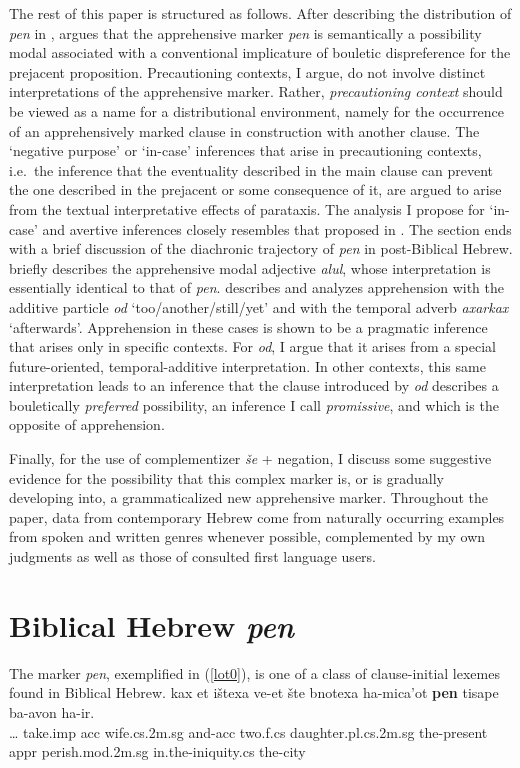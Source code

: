 \documentclass[output=paper,colorlinks,citecolor=brown]{langscibook}
\begin{document}
The rest of this paper is structured as follows. After describing the distribution of \textit{pen} in ,  argues that the apprehensive marker \textit{pen} is semantically a possibility modal associated with a conventional implicature of bouletic dispreference for the prejacent proposition. Precautioning contexts, I argue, do not involve distinct interpretations of the apprehensive marker. Rather, \textit{precautioning context} should be viewed as a name for a distributional environment, namely for the occurrence of an apprehensively marked clause in construction with another clause. The `negative purpose' or `in-case' inferences that arise in precautioning contexts, i.e.\ the inference that the eventuality described in the main clause can prevent the one described in the prejacent or some consequence of it, are argued to arise from the textual interpretative effects of parataxis. The analysis I propose for `in-case' and avertive inferences closely resembles that proposed in \citet{anderbois21}. The section ends with a brief discussion of the diachronic trajectory of \textit{pen} in post-Biblical Hebrew.  briefly describes the apprehensive modal adjective \textit{alul}, whose interpretation is essentially identical to that of \textit{pen}.  describes and analyzes apprehension with the additive particle \textit{od } `too/another/still/yet' and with the temporal adverb \textit{axarkax} `afterwards'. Apprehension in these cases is shown to be a pragmatic inference that arises only in specific contexts. For \textit{od}, I argue that it arises from a special future-oriented, temporal-additive interpretation. In other contexts, this same interpretation leads to an inference that the clause introduced by \textit{od} describes a bouletically \textit{preferred} possibility, an inference I call \textit{promissive}, and which is the opposite of apprehension.

Finally, for the use of complementizer \textit{še} + negation, I discuss some suggestive evidence for the possibility that this complex marker is, or is gradually developing into, a grammaticalized new apprehensive marker. Throughout the paper, data from contemporary Hebrew come from naturally occurring examples from spoken and written genres whenever possible, complemented by my own judgments as well as those of consulted first language users.

\section{Biblical Hebrew \textit{pen}}
\largerpage
\label{sec:biblicalhebrew}
The marker \textit{pen}, exemplified in (\ref{lot0}), is one of a class of clause-initial lexemes found in Biblical Hebrew. 
\ea
\label{lot0} 
\gll {\ldots} kax et ištexa ve-et šte bnotexa ha-mica'ot \textbf{pen} tisape ba-avon ha-ir. \\
{\ldots}  take.{\sc imp} {\sc acc} wife.{\sc cs}.2{\sc m.sg} and-{\sc acc} two.{\sc f.cs} daughter.{\sc pl.cs}.{\sc 2m.sg} the-present {\sc appr} perish.{\sc mod.2m.sg} in.the-iniquity.{\sc cs} the-city \\
\end{document}
